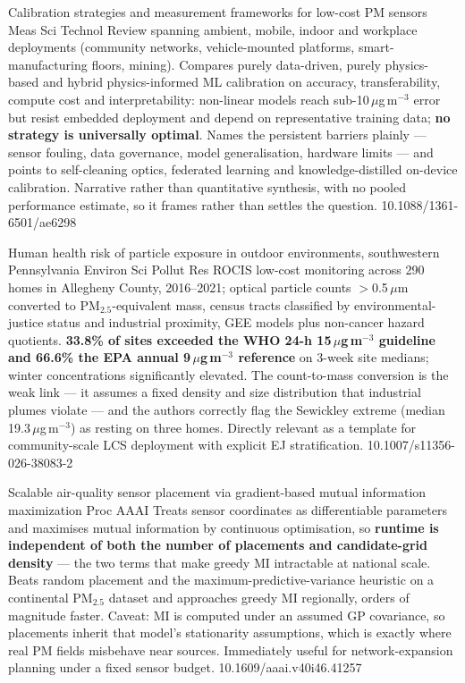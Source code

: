 \documentclass[10pt]{article}
\begin{document}
{Calibration strategies and measurement frameworks for low-cost PM sensors}
{Meas Sci Technol}
{Review spanning ambient, mobile, indoor and workplace deployments (community networks,
vehicle-mounted platforms, smart-manufacturing floors, mining). Compares purely
data-driven, purely physics-based and hybrid physics-informed ML calibration on accuracy,
transferability, compute cost and interpretability: non-linear models reach
sub-10\,$\mu$g\,m$^{-3}$ error but resist embedded deployment and depend on
representative training data; \textbf{no strategy is universally optimal}. Names the
persistent barriers plainly --- sensor fouling, data governance, model generalisation,
hardware limits --- and points to self-cleaning optics, federated learning and
knowledge-distilled on-device calibration. Narrative rather than quantitative synthesis,
with no pooled performance estimate, so it frames rather than settles the question.}
{10.1088/1361-6501/ae6298}

{Human health risk of particle exposure in outdoor environments, southwestern Pennsylvania}
{Environ Sci Pollut Res}
{ROCIS low-cost monitoring across 290 homes in Allegheny County, 2016--2021; optical
particle counts $>$0.5\,$\mu$m converted to PM$_{2.5}$-equivalent mass, census tracts
classified by environmental-justice status and industrial proximity, GEE models plus
non-cancer hazard quotients. \textbf{33.8\% of sites exceeded the WHO 24-h
15\,$\mu$g\,m$^{-3}$ guideline and 66.6\% the EPA annual 9\,$\mu$g\,m$^{-3}$ reference}
on 3-week site medians; winter concentrations significantly elevated. The count-to-mass
conversion is the weak link --- it assumes a fixed density and size distribution that
industrial plumes violate --- and the authors correctly flag the Sewickley extreme
(median 19.3\,$\mu$g\,m$^{-3}$) as resting on three homes. Directly relevant as a
template for community-scale LCS deployment with explicit EJ stratification.}
{10.1007/s11356-026-38083-2}

{Scalable air-quality sensor placement via gradient-based mutual information maximization}
{Proc AAAI}
{Treats sensor coordinates as differentiable parameters and maximises mutual information
by continuous optimisation, so \textbf{runtime is independent of both the number of
placements and candidate-grid density} --- the two terms that make greedy MI intractable
at national scale. Beats random placement and the maximum-predictive-variance heuristic
on a continental PM$_{2.5}$ dataset and approaches greedy MI regionally, orders of
magnitude faster. Caveat: MI is computed under an assumed GP covariance, so placements
inherit that model's stationarity assumptions, which is exactly where real PM fields
misbehave near sources. Immediately useful for network-expansion planning under a fixed
sensor budget.}
{10.1609/aaai.v40i46.41257}
\end{document}
